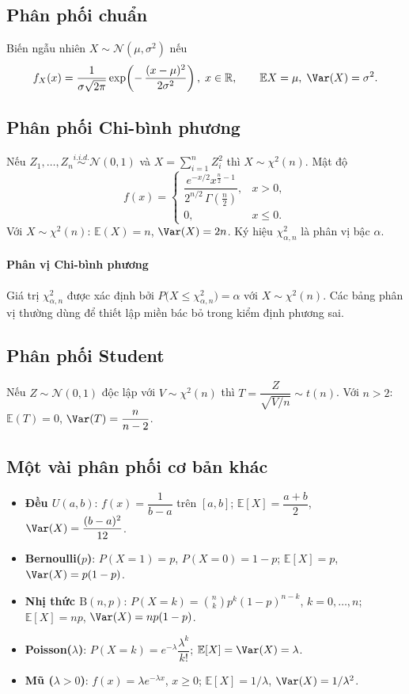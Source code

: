 \subsection{Phân phối chuẩn}
Biến ngẫu nhiên $X\sim\mathcal{N}(\mu,\sigma^2)$ nếu
\[
f_X(x)=\frac{1}{\sigma\sqrt{2\pi}}\exp\!\left(-\,\frac{(x-\mu)^2}{2\sigma^2}\right),\; x\in\mathbb{R},\qquad \mathbb{E}X=\mu,\; \Var(X)=\sigma^2.
\]

\subsection{Phân phối Chi-bình phương}
Nếu $Z_1,\ldots,Z_n\overset{i.i.d.}{\sim}\mathcal{N}(0,1)$ và $X=\sum_{i=1}^n Z_i^2$ thì $X\sim\chi^2(n)$. Mật độ
\[
f(x)=\begin{cases}\dfrac{e^{-x/2}x^{\frac{n}{2}-1}}{2^{n/2}\,\Gamma\!\left(\tfrac{n}{2}\right)}, & x>0,\\ 0, & x\le0.\end{cases}
\]
Với $X\sim\chi^2(n)$: $\mathbb{E}(X)=n$, $\Var(X)=2n$. Ký hiệu $\chi^2_{\alpha,n}$ là phân vị bậc $\alpha$.

\paragraph{Phân vị Chi-bình phương}
Giá trị $\chi^2_{\alpha,n}$ được xác định bởi $P\big(X\le \chi^2_{\alpha,n}\big)=\alpha$ với $X\sim\chi^2(n)$. Các bảng phân vị thường dùng để thiết lập miền bác bỏ trong kiểm định phương sai.

\subsection{Phân phối Student}
Nếu $Z\sim\mathcal{N}(0,1)$ độc lập với $V\sim\chi^2(n)$ thì $T=\dfrac{Z}{\sqrt{V/n}}\sim t(n)$. Với $n>2$: $\mathbb{E}(T)=0$, $\Var(T)=\dfrac{n}{n-2}$.

\subsection{Một vài phân phối cơ bản khác}
\begin{itemize}
    \item \textbf{Đều $U(a,b)$}: $f(x)=\dfrac{1}{b-a}$ trên $[a,b]$; $\mathbb{E}[X]=\dfrac{a+b}{2}$, $\Var(X)=\dfrac{(b-a)^2}{12}$.
    \item \textbf{Bernoulli($p$)}: $P(X=1)=p$, $P(X=0)=1-p$; $\mathbb{E}[X]=p$, $\Var(X)=p(1-p)$.
    \item \textbf{Nhị thức $\mathrm{B}(n,p)$}: $P(X=k)=\binom{n}{k}p^k(1-p)^{n-k}$, $k=0,\ldots,n$; $\mathbb{E}[X]=np$, $\Var(X)=np(1-p)$.
    \item \textbf{Poisson($\lambda$)}: $P(X=k)=e^{-\lambda}\dfrac{\lambda^k}{k!}$; $\mathbb{E}[X]=\Var(X)=\lambda$.
    \item \textbf{Mũ ($\lambda>0$)}: $f(x)=\lambda e^{-\lambda x}$, $x\ge0$; $\mathbb{E}[X]=1/\lambda$, $\Var(X)=1/\lambda^2$.
\end{itemize}

